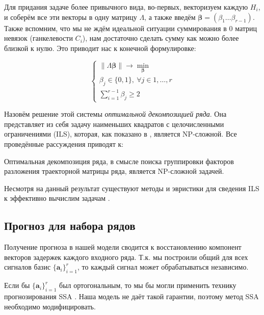 	    	Для придания задаче более привычного вида, во-первых, векторизуем каждую $ H_i $, и соберём все эти векторы в одну матрицу $ \Lambda $, а также введём $ \boldsymbol{\beta} = (\beta_1 \ldots \beta_{r-1}) $. Также вспомним, что мы не ждём идеальной ситуации суммирования в $ 0 $ матриц невязок (ганкелевости $ C_i $), нам достаточно сделать сумму как можно более близкой к нулю. Это приводит нас к конечной формулировке:
	    	
	    	\begin{equation}\label{eq:decomp_search_final}
	    		\begin{cases*}
	    			\lVert \Lambda \boldsymbol{\beta} \rVert \to \underset{\boldsymbol{\beta}}{\min} \\
	    			\beta_j \in \{0, 1\}, \ \forall j \in 1, \ldots, r \\
	    			\sum\limits_{i = 1}^{r - 1} \beta_j \ge 2
	    		\end{cases*}
	    	\end{equation}
	    	
	    	Назовём решение этой системы \emph{оптимальной декомпозицией ряда}. Она представляет из себя задачу наименьших квадратов с целочисленными ограничениями (ILS), которая, как показано в \cite{van1981another}, является NP-сложной. Все проведённые рассуждения приводят к:
	    	
	    	\begin{Th}
	    		Оптимальная декомпозиция ряда, в смысле поиска группировки факторов разложения траекторной матрицы ряда, является NP-сложной задачей.
	    	\end{Th}
	    	
	    	Несмотря на данный результат существуют методы и эвристики для сведения ILS к эффективно вычислим задачам \cite{Grafarend2022}.
	    	
	    	
	    \subsection*{Прогноз для набора рядов}
	     
	    	Получение прогноза в нашей модели сводится к восстановлению компонент векторов задержек каждого входного ряда. Т.к. мы построили общий для всех сигналов базис $ \{\mathbf{a}_i\}_{i = 1}^r $, то каждый сигнал может обрабатываться независимо.
	    	
	    	Если бы $ \{\mathbf{a}_i\}_{i = 1}^r $ был ортогональным, то мы бы могли применить технику прогнозирования SSA \cite{ecfb9dc578be43ae9ee8fc88b8ff9151}. Наша модель не даёт такой гарантии, поэтому метод SSA необходимо модифицировать.
	    	
